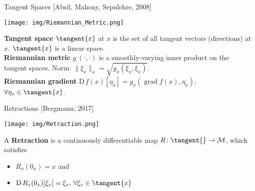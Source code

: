 \documentclass{beamer}
\begin{document}
\begin{frame}{Tangent Spaces}
    \vspace{-1\baselineskip}\hfill{\tiny{[Absil, Mahony, Sepulchre, 2008]}}
    \begin{center}
        \texttt{[image: img/Riemannian\_Metric.png]}
    \end{center}
    \textbf{Tangent space} $\tangent{x}$ at $x$ is the set of all tangent vectors (directions) at $x$. $\tangent{x}$ is a linear space. \\[0.2\baselineskip]
    \textbf{Riemannian metric} $g_{\cdot} (\cdot, \cdot)$ is a smoothly-varying inner product on the tangent spaces. Norm: $\lVert \xi_x \rVert_x = \sqrt{g_x(\xi_x, \xi_x)}$. \\[0.2\baselineskip]
    \textbf{Riemannian gradient} $\mathrm{D} \, f(x) [\eta_x] = g_x (\operatorname{grad} f(x), \eta_x),$ $\forall \eta_x \in \tangent{x}$.
\end{frame}

\begin{frame}{Retractions}
    \vspace{-1\baselineskip}\hfill{\tiny{[Bergmann, 2017]}}
    \begin{center}
        \texttt{[image: img/Retraction.png]}
    \end{center}
    A \textbf{Retraction} is a continuously differentiable map $R \colon \tangent{} \to \mathcal{M}$, which satisfies \\[-0.2\baselineskip]
    \begin{itemize}
        \item $R_x (0_x) = x$ and
        \item $\mathrm{D} \, R_x (0_x)[\xi_x] = \xi_x, \, \forall \xi_x \in \tangent{x}$
    \end{itemize}
\end{frame}
\end{document}
